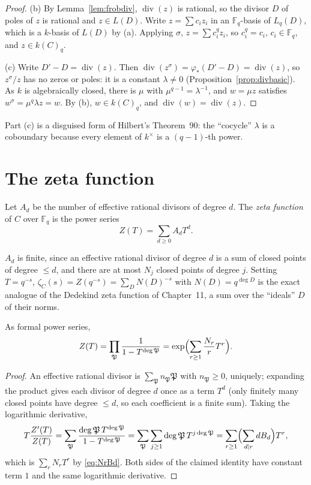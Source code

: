 \begin{proof}
(b) By Lemma~\ref{lem:frobdiv}, $\operatorname{div}(z)$ is rational, so the divisor $D$ of poles of $z$ is rational and $z\in L(D)$. Write $z=\sum c_iz_i$ in an
$\mathbb F_q$-basis of $L_q(D)$, which is a $k$-basis of $L(D)$ by (a). Applying $\sigma$, $z=\sum c_i^qz_i$, so $c_i^q=c_i$, $c_i\in\mathbb F_q$, and
$z\in k(C)_q$.

(c) Write $D'-D=\operatorname{div}(z)$. Then $\operatorname{div}(z^\sigma)=\varphi_*(D'-D)=\operatorname{div}(z)$, so $z^\sigma/z$ has no zeros or poles: it is a
constant $\lambda\ne0$ (Proposition~\ref{prop:divbasic}). As $k$ is algebraically closed, there is $\mu$ with $\mu^{q-1}=\lambda^{-1}$, and
$w=\mu z$ satisfies $w^\sigma=\mu^q\lambda z=w$. By (b), $w\in k(C)_q$, and $\operatorname{div}(w)=\operatorname{div}(z)$.
\end{proof}

Part (c) is a disguised form of Hilbert's Theorem~90: the ``cocycle'' $\lambda$ is a coboundary because every element of $k^\times$ is a $(q-1)$-th power.

\section{The zeta function}

\begin{definition}
Let $A_d$ be the number of effective rational divisors of degree $d$. The \emph{zeta function} of $C$ over $\mathbb F_q$ is the power series
\[
Z(T)=\sum_{d\ge0}A_dT^d.
\]
\end{definition}

$A_d$ is finite, since an effective rational divisor of degree $d$ is a sum of closed points of degree $\le d$, and there are at most $N_j$ closed points of degree
$j$. Setting $T=q^{-s}$, $\zeta_C(s)=Z(q^{-s})=\sum_D N(D)^{-s}$ with $N(D)=q^{\deg D}$ is the exact analogue of the Dedekind zeta function of Chapter~11, a sum over
the ``ideals'' $D$ of their norms.

\begin{proposition}\label{prop:euler}
As formal power series,
\[
Z(T)=\prod_{\mathfrak P}\frac1{1-T^{\deg\mathfrak P}}=\exp\Bigl(\sum_{r\ge1}\frac{N_r}rT^r\Bigr).
\]
\end{proposition}
\begin{proof}
An effective rational divisor is $\sum_{\mathfrak P}n_{\mathfrak P}\mathfrak P$ with $n_{\mathfrak P}\ge0$, uniquely; expanding the product gives each divisor of
degree $d$ once as a term $T^d$ (only finitely many closed points have degree $\le d$, so each coefficient is a finite sum). Taking the logarithmic derivative,
\[
T\frac{Z'(T)}{Z(T)}=\sum_{\mathfrak P}\frac{\deg\mathfrak P\,T^{\deg\mathfrak P}}{1-T^{\deg\mathfrak P}}=\sum_{\mathfrak P}\sum_{j\ge1}\deg\mathfrak P\,T^{j\deg\mathfrak P}
=\sum_{r\ge1}\Bigl(\sum_{d\mid r}dB_d\Bigr)T^r,
\]
which is $\sum_rN_rT^r$ by \eqref{eq:NrBd}. Both sides of the claimed identity have constant term $1$ and the same logarithmic derivative.
\end{proof}

